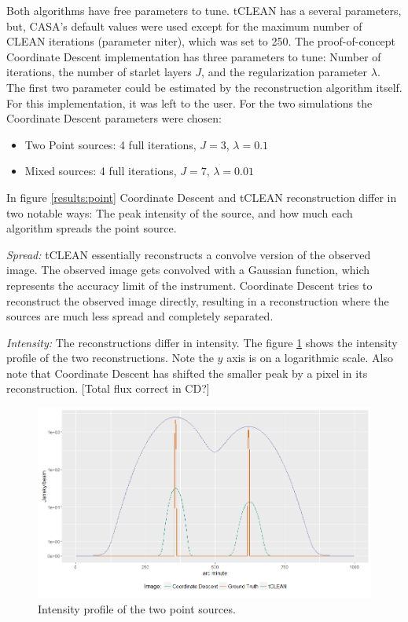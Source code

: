 Both algorithms have free parameters to tune. tCLEAN has a several parameters, but, CASA's default values were used except for the maximum number of CLEAN iterations (parameter niter), which was set to 250. The proof-of-concept Coordinate Descent implementation has three parameters to tune: Number of iterations, the number of starlet layers $J$, and the regularization parameter $\lambda$. The first two parameter could be estimated by the reconstruction algorithm itself. For this implementation, it was left to the user. For the two simulations the Coordinate Descent parameters were chosen:
\begin{itemize}
	\item Two Point sources: 4 full iterations, $J=3$, $\lambda=0.1$
	\item Mixed sources: 4 full iterations, $J=7$, $\lambda=0.01$
\end{itemize}

In figure \ref{results:point} Coordinate Descent and tCLEAN reconstruction differ in two notable ways: The peak intensity of the source, and how much each algorithm spreads the point source. 

\textit{Spread:} tCLEAN essentially reconstructs a convolve version of the observed image. The observed image gets convolved with a Gaussian function, which represents the accuracy limit of the instrument. Coordinate Descent tries to reconstruct the observed image directly, resulting in a reconstruction where the sources are much less spread and completely separated. 

\textit{Intensity:} The reconstructions differ in intensity. The figure \ref{results:points:contour} shows the intensity profile of the two reconstructions. Note the $y$ axis is on a logarithmic scale. Also note that Coordinate Descent has shifted the smaller peak by a pixel in its reconstruction. [Total flux correct in CD?]

\begin{figure}[h]
	\centering
	\includegraphics[width=0.8\linewidth]{./chapters/20.results/points/line.png}
	\caption{Intensity profile of the two point sources.}
	\label{results:points:contour}
\end{figure}

